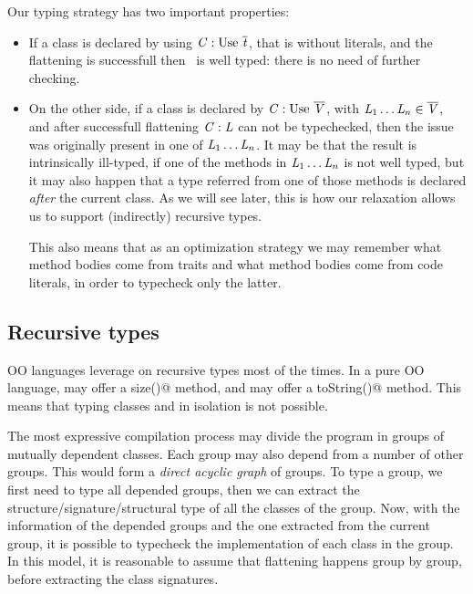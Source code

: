 Our typing strategy has two important properties:
\begin{itemize}
\item If a class is declared by using $\mC : \use\ \overline\mt$, that is without literals,
and the flattening is successfull then \mC\ is well typed: there is no need of further checking.
\item On the other side, if a class is declared by $\mC : \use\ \overline\mV$, with
$\mathit{L}_1\ldots\mathit{L}_n \in \overline{\mathit{V}}$, and after successfull flattening $\mathit{C} : \mathit{L}$ can not be typechecked,
then the issue was originally present in one of $\mathit{L}_1\ldots\mathit{L}_n$.
It may be that the result is intrinsically ill-typed, if one of the methods in $\mathit{L}_1\ldots\mathit{L}_n$ is not well typed,
but it may also happen that a type referred from one of those methods
is declared \emph{after} the current class. As we will see later, this
is how our relaxation allows us to support (indirectly) recursive types.

This also means that as an optimization strategy
 we may remember what method bodies come from traits and what method bodies come from code literals, in order to typecheck only the latter.
 \end{itemize}

 \subsection{Recursive types}

OO languages leverage on recursive types most of the times.
In a pure OO language, \Q@String@ may offer a \Q@Int size()@
method, and \Q@Int@ may offer a \Q@String toString()@ method.
This means that typing classes 
\Q@String@ and \Q@Int@ in isolation is not possible.

The most expressive compilation process may divide the program in groups of mutually 
dependent classes.
Each group may also depend from a number of other groups.
This would form a \emph{direct acyclic graph} of groups.
To type a group, we first need to type all depended groups, then
we can extract the structure/signature/structural type of all
the classes of the group.
Now, with the information of the depended groups and the one extracted
from the current group, it is possible to typecheck the implementation
 of each class in the group.
In this model, it is reasonable to assume that flattening happens group by group, before
extracting the class signatures.

